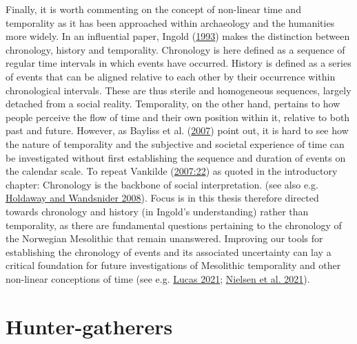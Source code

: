 \documentclass[
  12pt,
  a4paper,
  oneside]{book}
\begin{document}
Finally, it is worth commenting on the concept of non-linear time and temporality as it has been approached within archaeology and the humanities more widely. In an influential paper, Ingold (\protect\hyperlink{ref-ingold1993}{1993}) makes the distinction between chronology, history and temporality. Chronology is here defined as a sequence of regular time intervals in which events have occurred. History is defined as a series of events that can be aligned relative to each other by their occurrence within chronological intervals. These are thus sterile and homogeneous sequences, largely detached from a social reality. Temporality, on the other hand, pertains to how people perceive the flow of time and their own position within it, relative to both past and future. However, as Bayliss et al. (\protect\hyperlink{ref-bayliss2007}{2007}) point out, it is hard to see how the nature of temporality and the subjective and societal experience of time can be investigated without first establishing the sequence and duration of events on the calendar scale. To repeat Vankilde (\protect\hyperlink{ref-vankilde2007}{2007:22}) as quoted in the introductory chapter: \textquotesingle Chronology is the backbone of social interpretation.\textquotesingle{} (see also e.g. \protect\hyperlink{ref-holdaway2008}{Holdaway and Wandsnider 2008}). Focus is in this thesis therefore directed towards chronology and history (in Ingold's understanding) rather than temporality, as there are fundamental questions pertaining to the chronology of the Norwegian Mesolithic that remain unanswered. Improving our tools for establishing the chronology of events and its associated uncertainty can lay a critical foundation for future investigations of Mesolithic temporality and other non-linear conceptions of time (see e.g. \protect\hyperlink{ref-lucas2021}{Lucas 2021}; \protect\hyperlink{ref-nielsen2021c}{Nielsen et al. 2021}).

\hypertarget{hunter-gatherers}{%
\section{Hunter-gatherers}\label{hunter-gatherers}}
\end{document}
